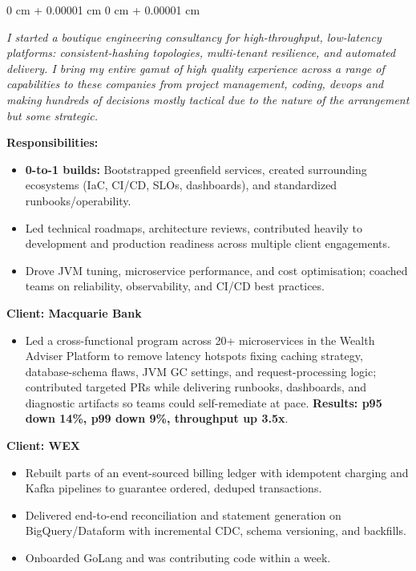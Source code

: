 \documentclass[10pt, letterpaper]{article}
\newenvironment{highlights}{
    \begin{itemize}[
        topsep=0.10 cm,
        parsep=0.10 cm,
        partopsep=0pt,
        itemsep=0pt,
        leftmargin=0 cm + 10pt
    ]
}{
    \end{itemize}
} %
\newenvironment{onecolentry}{
    \begin{adjustwidth}{
        0 cm + 0.00001 cm
    }{
        0 cm + 0.00001 cm
    }
}{
    \end{adjustwidth}
} %
\begin{document}
        \vspace{0.10 cm}
        \begin{onecolentry}
            \textit{I started a boutique engineering consultancy for high-throughput, low-latency platforms: consistent-hashing topologies, multi-tenant resilience, and automated delivery. I bring my entire gamut of high quality experience across a range of capabilities to these companies from project management, coding, devops and making hundreds of decisions mostly tactical due to the nature of the arrangement but some strategic.}
            
            \vspace{0.10 cm}
            \textbf{Responsibilities:}
            \begin{highlights}
                \item \textbf{0-to-1 builds:} Bootstrapped greenfield services, created surrounding ecosystems (IaC, CI/CD, SLOs, dashboards), and standardized runbooks/operability.
                \item Led technical roadmaps, architecture reviews, contributed heavily to development and production readiness across multiple client engagements.
                \item Drove JVM tuning, microservice performance, and cost optimisation; coached teams on reliability, observability, and CI/CD best practices.
            \end{highlights}
            
            \vspace{0.10 cm}
            \textbf{Client: Macquarie Bank}
            \begin{highlights}
                \item Led a cross-functional program across 20+ microservices in the Wealth Adviser Platform to remove latency hotspots fixing caching strategy, database-schema flaws, JVM GC settings, and request-processing logic; contributed targeted PRs while delivering runbooks, dashboards, and diagnostic artifacts so teams could self-remediate at pace. \textbf{Results: p95 down 14\%, p99 down 9\%, throughput up 3.5x}.
            \end{highlights}
            
            \vspace{0.10 cm}
            \textbf{Client: WEX}
            \begin{highlights}
                \item Rebuilt parts of an event-sourced billing ledger with idempotent charging and Kafka pipelines to guarantee ordered, deduped transactions.
                \item Delivered end-to-end reconciliation and statement generation on BigQuery/Dataform with incremental CDC, schema versioning, and backfills.
                \item Onboarded GoLang and was contributing code within a week.
            \end{highlights}
            

\end{onecolentry}
\end{document}
